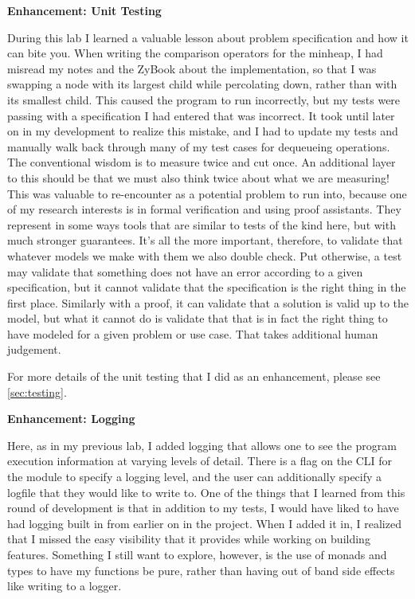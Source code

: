 \documentclass[10pt,letterpaper,final]{report}
\begin{document}
\noindent \textbf{Enhancement: Unit Testing}
\medskip

During this lab I learned a valuable lesson about problem specification and how it can bite you. When writing the comparison operators for the minheap, I had misread my notes and the ZyBook about the implementation, so that I was swapping a node with its largest child while percolating down, rather than with its smallest child. This caused the program to run incorrectly, but my tests were passing with a specification I had entered that was incorrect. It took until later on in my development to realize this mistake, and I had to update my tests and manually walk back through many of my test cases for dequeueing operations. The conventional wisdom is to measure twice and cut once. An additional layer to this should be that we must also think twice about what we are measuring! This was valuable to re-encounter as a potential problem to run into, because one of my research interests is in formal verification and using proof assistants. They represent in some ways tools that are similar to tests of the kind here, but with much stronger guarantees. It's all the more important, therefore, to validate that whatever models we make with them we also double check. Put otherwise, a test may validate that something does not have an error according to a given specification, but it cannot validate that the specification is the right thing in the first place. Similarly with a proof, it can validate that a solution is valid up to the model, but what it cannot do is validate that that is in fact the right thing to have modeled for a given problem or use case. That takes additional human judgement.

For more details of the unit testing that I did as an enhancement, please see \ref{sec:testing}.

\medskip
\noindent \textbf{Enhancement: Logging}
\medskip

Here, as in my previous lab, I added logging that allows one to see the program execution information at varying levels of detail. There is a flag on the CLI for the module to specify a logging level, and the user can additionally specify a logfile that they would like to write to. One of the things that I learned from this round of development is that in addition to my tests, I would have liked to have had logging built in from earlier on in the project. When I added it in, I realized that I missed the easy visibility that it provides while working on building features. Something I still want to explore, however, is the use of monads and types to have my functions be pure, rather than having out of band side effects like writing to a logger.
\end{document}
